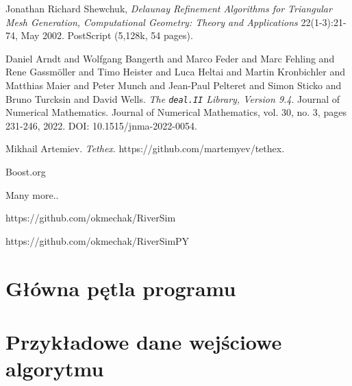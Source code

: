 \documentclass[]{pracamgr}
\begin{document}
  

  \begin{thebibliography}{99}

     Jonathan Richard Shewchuk, \textit{Delaunay Refinement Algorithms for Triangular Mesh Generation, Computational Geometry: Theory and Applications} 22(1-3):21-74, May 2002. PostScript (5,128k, 54 pages).

     Daniel Arndt and Wolfgang Bangerth and Marco Feder and
    Marc Fehling and Rene Gassm{\"o}ller and Timo Heister
    and Luca Heltai and Martin Kronbichler and
    Matthias Maier and Peter Munch and Jean-Paul Pelteret
    and Simon Sticko and Bruno Turcksin and David Wells. \textit{The \texttt{deal.II} Library, Version 9.4}.
    Journal of Numerical Mathematics. Journal of Numerical Mathematics, vol. 30, no. 3, pages 231-246, 2022.
    DOI: 10.1515/jnma-2022-0054.

     Mikhail Artemiev. \textit{Tethex}. https://github.com/martemyev/tethex.

     Boost.org

     Many more.. 

     https://github.com/okmechak/RiverSim

     https://github.com/okmechak/RiverSimPY

  \end{thebibliography}

  \appendix

  \chapter{Główna pętla programu}

  \chapter{Przykładowe dane wejściowe algorytmu}
\end{document}
